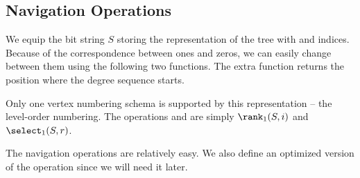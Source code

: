 \subsection{Navigation Operations}

We equip the bit string $S$ storing the representation of the tree with \rank{} and \select{} indices.
Because of the correspondence between ones and zeros, we can easily change between them using the following two functions.
The extra function \toBeginning{} returns the position where the degree sequence starts.

\begin{algorithm}
\begin{algorithmic}
	\State {}
\EndFunction
\end{algorithmic}
\end{algorithm}

\begin{algorithm}
\begin{algorithmic}
	\State {}
\EndFunction
\end{algorithmic}
\end{algorithm}

\begin{algorithm}
\begin{algorithmic}
	\State {}
\EndFunction
\end{algorithmic}
\end{algorithm}

Only one vertex numbering schema is supported by this representation -- the level-order numbering.
The operations \loRank{} and \loSelect{} are simply $\rank_1(S, i)$ and $\select_1(S, r)$.


The navigation operations are relatively easy.
We also define an optimized version of the operation \childLast since we will need it later.

\begin{algorithm}
\begin{algorithmic}
	\State {}
\EndFunction
\end{algorithmic}
\end{algorithm}

\begin{algorithm}
\begin{algorithmic}
	\State {} 
\EndFunction
\end{algorithmic}
\end{algorithm}

